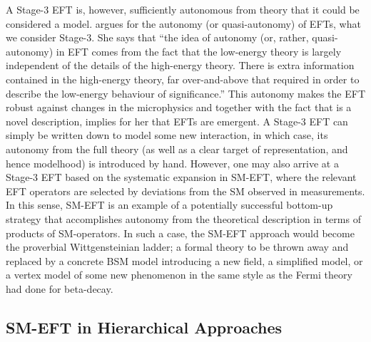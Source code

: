 A Stage-3 EFT is, however, sufficiently autonomous from theory that it could be considered a model. 
\citet{Crowther2016-CROESU} argues for the autonomy (or quasi-autonomy) of EFTs, what we consider Stage-3.
She says that ``the idea of autonomy (or, rather, quasi-autonomy) in EFT comes from the fact that the low-energy theory is largely independent of the details of the high-energy theory. There is extra information contained in the high-energy theory, far over-and-above that required in order to describe the low-energy behaviour of significance.'' 
This autonomy makes the EFT robust against changes in the microphysics and together with the fact that is a novel description, implies for her that EFTs are emergent.  
A Stage-3 EFT can simply be written down to model some new interaction, in which case, its autonomy from the full theory (as well as a clear target of representation, and hence modelhood) is introduced by hand. 
However, one may also arrive at a Stage-3 EFT based on the systematic expansion in SM-EFT, where the relevant EFT operators are selected by deviations from the SM observed in measurements. 
In this sense, SM-EFT is an example of a potentially successful bottom-up strategy that accomplishes autonomy from the theoretical description in terms of products of SM-operators. 
In such a case, the SM-EFT approach would become the proverbial Wittgensteinian ladder; a formal theory to be thrown away and replaced by a concrete BSM model introducing a new field, a simplified model, or a vertex model of some new phenomenon in the same style as the Fermi theory had done for beta-decay.


\subsection{SM-EFT in Hierarchical Approaches}
\label{sub:modelhood}


